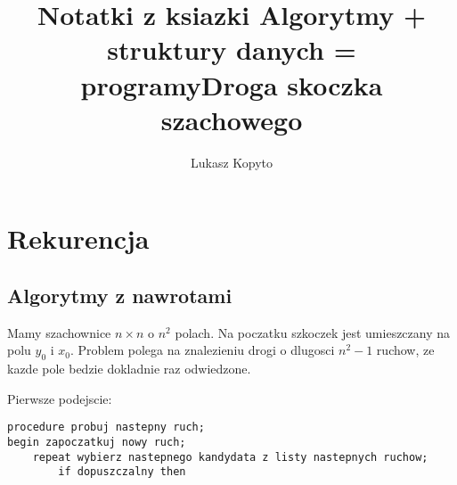 \documentclass{article}
\author{Lukasz Kopyto}
\title{Notatki z ksiazki Algorytmy + struktury danych = programy}
\begin{document}
\maketitle     %

\section{Rekurencja}
\subsection{Algorytmy z nawrotami}
\title{Droga skoczka szachowego}


Mamy szachownice $n \times n$ o $n^{2}$ polach. Na poczatku szkoczek jest umieszczany na polu $y_{0}$ i $x_{0}$. Problem polega na znalezieniu drogi o dlugosci $n^{2}-1$ ruchow, ze kazde pole bedzie dokladnie raz odwiedzone.

Pierwsze podejscie:

\begin{verbatim}
procedure probuj nastepny ruch;
begin zapoczatkuj nowy ruch;
    repeat wybierz nastepnego kandydata z listy nastepnych ruchow;
        if dopuszczalny then
        
\end{verbatim}
\end{document}
